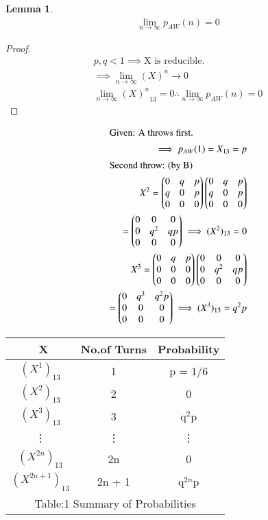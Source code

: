 \documentclass[journal,12pt,twocolumn]{IEEEtran}
\theoremstyle{definition}
\newtheorem{lemma}[theorem]{Lemma}
\newcommand{\myvec}[1]{\ensuremath{\begin{pmatrix}#1\end{pmatrix}}}
\numberwithin{equation}{subsection}
\begin{document}
\begin{lemma} \large
    \begin{align*}
        \lim_{n \to \infty}p_{AW}(n) = 0
    \end{align*}
\end{lemma}
\begin{proof}
   \begin{align*}
      p , q < 1
      \implies \text{X is reducible.}\\
     \implies \lim_{n \to \infty} (X)^n \to 0\label{Eqn:2.1}\\
         \lim_{n \to \infty}{(X)^n}_{13} = 0
         \therefore \lim_{n \to \infty} p_{AW}(n) = 0
    \end{align*}
\end{proof}
\begin{align*}
    \intertext{Given: A throws first.}
    \implies p_{AW}(1) = X_{13} = p\\ 
    \intertext{Second throw: (by B)}
    X^2 = \myvec{0 & q & p\\ q & 0 & p\\ 0 & 0 & 0} \myvec{0 & q & p\\ q & 0 & p\\ 0 & 0 & 0}\\
    = \myvec{ 0 & 0 & 0\\0 & q^2 & qp\\0 & 0 & 0}
    \implies  (X^2)_{13} = 0\\
    X^3 = \myvec{ 0 & q & p\\0 & 0 & 0\\0 & 0 & 0}\myvec{ 0 & 0 & 0\\0 & q^2 & qp\\0 & 0 & 0}\\
    =\myvec{ 0 & q^3 & q^2p\\0 & 0 & 0\\0 & 0 & 0}
    \implies  (X^3)_{13} = q^2 p\\
\end{align*}
\centering \begin{tabular}{|c|c|c|}
    \hline\
    X&No.of Turns & Probability \\
    \hline
    $(X^1)_{13}$ & 1 & p = 1/6\\
    \hline
    $(X^2)_{13}$ & 2 & 0\\
    \hline
    $(X^3)_{13}$ & 3 & q$^2$p\\
    \hline
    \vdots & \vdots & \vdots\\
    $(X^{2n})_{13}$ & 2n & 0\\
    \hline
    $(X^{2n + 1})_{13}$ & 2n + 1 & q$^{2n}$p\\
    \hline
    \multicolumn{3}{c}{Table:1 Summary of Probabilities}\\
\end{tabular}
\end{document}
